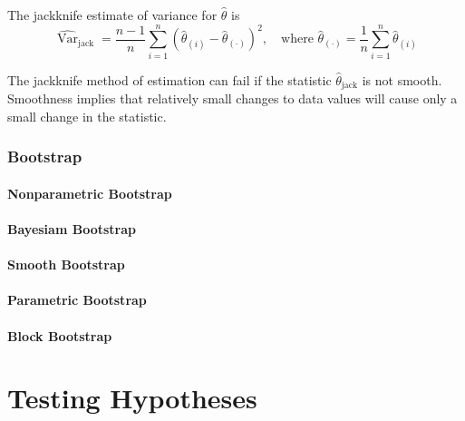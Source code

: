 The jackknife estimate of variance for $\hat{\theta}$ is
\begin{equation}
    \widehat{\operatorname{Var}}_{\text{jack}}=\frac{n-1}{n}\sum_{i=1}^{n}\left(\hat{\theta}_{(i)}-\hat{\theta}_{(\cdot)}\right)^{2},\quad\text{where }\hat{\theta}_{(\cdot)}=\frac{1}{n}\sum_{i=1}^{n}\hat{\theta}_{(i)}
\end{equation}

The jackknife method of estimation can fail if the statistic $\hat{\theta}_{\text{jack}}$ is not smooth. Smoothness
implies that relatively small changes to data values will cause only a small change in the
statistic.

\begin{example}

\end{example}

\begin{example}

\end{example}

\subsubsection{Bootstrap}

\paragraph{Nonparametric Bootstrap}

\paragraph{Bayesiam Bootstrap}

\paragraph{Smooth Bootstrap}

\paragraph{Parametric Bootstrap}

\paragraph{Block Bootstrap}

\section{Testing Hypotheses}